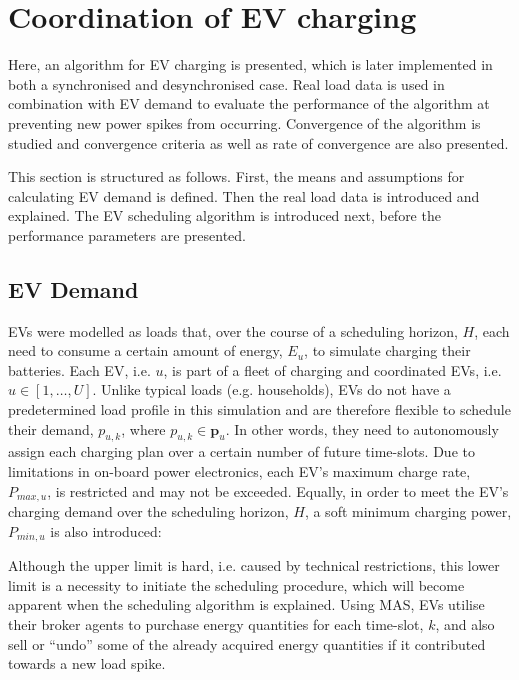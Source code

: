 \section{Coordination of EV charging}
\label{ch3:sec:ev-coordination}

Here, an algorithm for EV charging is presented, which is later implemented in both a synchronised and desynchronised case.
Real load data is used in combination with EV demand to evaluate the performance of the algorithm at preventing new power spikes from occurring.
Convergence of the algorithm is studied and convergence criteria as well as rate of convergence are also presented.

This section is structured as follows.
First, the means and assumptions for calculating EV demand is defined.
Then the real load data is introduced and explained.
The EV scheduling algorithm is introduced next, before the performance parameters are presented.

\subsection{EV Demand}

EVs were modelled as loads that, over the course of a scheduling horizon, $H$, each need to consume a certain amount of energy, $E_u$, to simulate charging their batteries.
Each EV, i.e. $u$, is part of a fleet of charging and coordinated EVs, i.e. $u \in [1, \dots, U]$.
Unlike typical loads (e.g. households), EVs do not have a predetermined load profile in this simulation and are therefore flexible to schedule their demand, $p_{u,k}$, where $p_{u,k} \in \textbf{p}_u$.
In other words, they need to autonomously assign each charging plan over a certain number of future time-slots.
Due to limitations in on-board power electronics, each EV's maximum charge rate, $P_{max,u}$, is restricted and may not be exceeded.
Equally, in order to meet the EV's charging demand over the scheduling horizon, $H$, a soft minimum charging power, $P_{min,u}$ is also introduced:



Although the upper limit is hard, i.e. caused by technical restrictions, this lower limit is a necessity to initiate the scheduling procedure, which will become apparent when the scheduling algorithm is explained.
Using MAS, EVs utilise their broker agents to purchase energy quantities for each time-slot, $k$, and also sell or ``undo'' some of the already acquired energy quantities if it contributed towards a new load spike.

